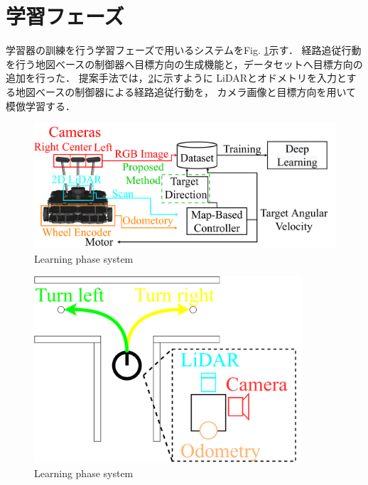 \section{学習フェーズ}
\label{lerning}
学習器の訓練を行う学習フェーズで用いるシステムをFig. \ref{fig::learningsystem}示す．
経路追従行動を行う地図べースの制御器へ目標方向の生成機能と，データセットへ目標方向の追加を行った．
提案手法では，\ref{fig::learning_abs}に示すように
LiDARとオドメトリを入力とする地図べースの制御器による経路追従行動を，
カメラ画像と目標方向を用いて模倣学習する．
  \begin{figure}[h]
    \centering
    \includegraphics[width = 12cm]{./figs/system_learning.pdf}
    \caption{Learning phase system }
    \label{fig::learningsystem}
\end{figure}
\begin{figure}[h]
  \centering
  \includegraphics[width = 10cm]{./figs/ler_abs.pdf}
  \caption{Learning phase system }
  \label{fig::learning_abs}
\end{figure}
\newpage
